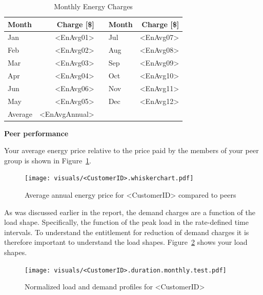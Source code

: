 \documentclass[11pt]{article}
\begin{document}
\begin{table}[th!]
  \centering
  \caption{Monthly Energy Charges}
  \vspace{1.5ex}
  \label{tab:energy}
  \begin{tabular}{p{0.75in}rp{0.2in}p{0.75in}r}
    Month & Charge [\$] & & Month & Charge [\$] \\
    \midrule
    Jan & <EnAvg01> & & Jul & <EnAvg07> \\
    Feb & <EnAvg02> & & Aug & <EnAvg08> \\
    Mar & <EnAvg03> & & Sep & <EnAvg09> \\
    Apr & <EnAvg04> & & Oct & <EnAvg10> \\
    Jun & <EnAvg06> & & Nov & <EnAvg11> \\
    May & <EnAvg05> & & Dec & <EnAvg12> \\
    \midrule
    Average & <EnAvgAnnual> & & &
  \end{tabular}
\end{table}

\vspace{3ex}
\textbf{\Large Peer performance}
\vspace{1ex}

Your average energy price relative to the price paid by the members of your peer group is shown in Figure~\ref{fig:PeerCompEn}.

\begin{figure}[!h]
\centering
\texttt{[image: visuals/<CustomerID>.whiskerchart.pdf]}
\caption{Average annual energy price for <CustomerID> compared to peers}
\label{fig:PeerCompEn}
\end{figure}

\clearpage

\pagestyle{demand}

As was discussed earlier in the report, the demand charges are a function of the load shape.
Specifically, the function of the peak load in the rate-defined time intervals.
To understand the entitlement for reduction of demand charges it is therefore important to understand the load shapes.
Figure~\ref{fig:duration} shows your load shapes.
\begin{figure}[!h]
\centering
\texttt{[image: visuals/<CustomerID>.duration.monthly.test.pdf]}
\caption{Normalized load and demand profiles for <CustomerID>}
\label{fig:duration}
\end{figure}
\end{document}
